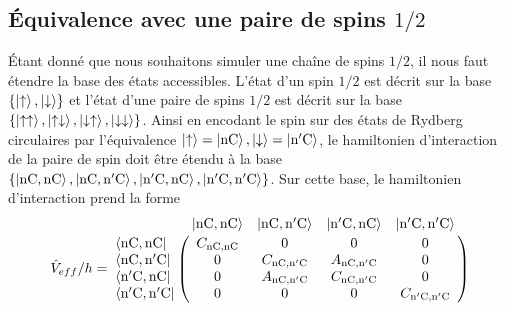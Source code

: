 	\subsection{Équivalence avec une paire de spins $1/2$}
\noindent Étant donné que nous souhaitons simuler une chaîne de spins $1/2$, il nous faut étendre la base des états accessibles.
L'état d'un spin $1/2$ est décrit sur la base $\{\ket{\uparrow},\ket{\downarrow}\}$ et l'état d'une paire de spins $1/2$ est décrit sur la base $\{ \ket{\uparrow \uparrow},\ket{\uparrow \downarrow}, \ket{\downarrow\uparrow}, \ket{\downarrow\downarrow} \}$.
Ainsi en encodant le spin sur des états de Rydberg circulaires par l'équivalence $\ket{\uparrow} = \ket{\mathrm{nC}} , \ket{\downarrow} = \ket{\mathrm{n'C}}$, le hamiltonien d'interaction de la paire de spin doit être étendu à la base 
$\{ \ket{\mathrm{nC},\mathrm{nC}},\ket{\mathrm{nC},\mathrm{n'C}}, \ket{\mathrm{n'C},\mathrm{nC}}, \ket{\mathrm{n'C},\mathrm{n'C}} \}$.
Sur cette base, le hamiltonien d'interaction prend la forme
\begin{equation}
\label{eq:V_eff_nCnC_n'Cn'c}
\hat{V}_{eff}/h = \bordermatrix{
~ 	&\ket{\mathrm{nC},\mathrm{nC}} 	&\ket{\mathrm{nC},\mathrm{n'C}} 
&\ket{\mathrm{n'C},\mathrm{nC}} &\ket{\mathrm{n'C},\mathrm{n'C}} \cr
	\bra{\mathrm{nC},\mathrm{nC}}	& C_{\mathrm{nC},\mathrm{nC}} & 0 & 0 & 0 \cr 
	\bra{\mathrm{nC},\mathrm{n'C}} 	& 0 & C_{\mathrm{nC},\mathrm{n'C}} & A_{\mathrm{nC},\mathrm{n'C}} & 0 \cr
	\bra{\mathrm{n'C},\mathrm{nC}} 	& 0 & A_{\mathrm{nC},\mathrm{n'C}} & C_{\mathrm{nC},\mathrm{n'C}} & 0 \cr
	\bra{\mathrm{n'C},\mathrm{n'C}} & 0 & 0 &  0	& C_{\mathrm{n'C},\mathrm{n'C}}\cr
	}
\end{equation}


